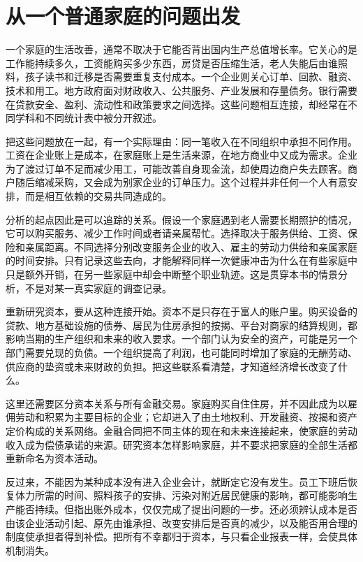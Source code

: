 \documentclass[UTF8,fontset=fandol,zihao=-4,oneside,openany]{ctexbook}
\begin{document}
\section{从一个普通家庭的问题出发}
一个家庭的生活改善，通常不取决于它能否背出国内生产总值增长率。它关心的是工作能持续多久，工资能购买多少东西，房贷是否压缩生活，老人失能后由谁照料，孩子读书和迁移是否需要重复支付成本。一个企业则关心订单、回款、融资、技术和用工。地方政府面对财政收入、公共服务、产业发展和存量债务。银行需要在贷款安全、盈利、流动性和政策要求之间选择。这些问题相互连接，却经常在不同学科和不同统计表中被分开叙述。

\label{arg:P001}
把这些问题放在一起，有一个实际理由：同一笔收入在不同组织中承担不同作用。工资在企业账上是成本，在家庭账上是生活来源，在地方商业中又成为需求。企业为了渡过订单不足而减少用工，可能改善自身现金流，却使周边商户失去顾客。商户随后缩减采购，又会成为别家企业的订单压力。这个过程并非任何一个人有意安排，而是相互依赖的交易共同造成的。

分析的起点因此是可以追踪的关系。假设一个家庭遇到老人需要长期照护的情况，它可以购买服务、减少工作时间或者请亲属帮忙。选择取决于服务供给、工资、保险和亲属距离。不同选择分别改变服务企业的收入、雇主的劳动力供给和亲属家庭的时间安排。只有记录这些去向，才能解释同样一次健康冲击为什么在有些家庭中只是额外开销，在另一些家庭中却会中断整个职业轨迹。这是贯穿本书的情景分析，不是对某一真实家庭的调查记录。

重新研究资本，要从这种连接开始。资本不是只存在于富人的账户里。购买设备的贷款、地方基础设施的债券、居民为住房承担的按揭、平台对商家的结算规则，都影响当期的生产组织和未来的收入要求。一个部门认为安全的资产，可能是另一个部门需要兑现的负债。一个组织提高了利润，也可能同时增加了家庭的无酬劳动、供应商的垫资或未来财政的负担。把这些联系看清楚，才知道经济增长改变了什么。

\label{arg:P002}
这里还需要区分资本关系与所有金融交易。家庭购买自住住房，并不因此成为以雇佣劳动和积累为主要目标的企业；它却进入了由土地权利、开发融资、按揭和资产定价构成的关系网络。金融合同把不同主体的现在和未来连接起来，使家庭的劳动收入成为偿债承诺的来源。研究资本怎样影响家庭，并不要求把家庭的全部生活都重新命名为资本活动。

反过来，不能因为某种成本没有进入企业会计，就断定它没有发生。员工下班后恢复体力所需的时间、照料孩子的安排、污染对附近居民健康的影响，都可能影响生产能否持续。但指出账外成本，仅仅完成了提出问题的一步。还必须辨认成本是否由该企业活动引起、原先由谁承担、改变安排后是否真的减少，以及能否用合理的制度使承担者得到补偿。把所有不幸都归于资本，与只看企业报表一样，会使具体机制消失。
\end{document}
